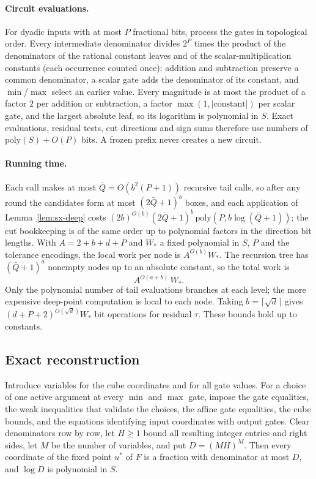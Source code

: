 \paragraph{Circuit evaluations.} For dyadic inputs with at most $P$ fractional bits, process the gates
in topological order. Every intermediate denominator divides $2^P$ times the product of the
denominators of the rational constant leaves and of the scalar-multiplication constants (each occurrence
counted once): addition and subtraction preserve a common denominator, a scalar gate adds the
denominator of its constant, and $\min$/$\max$ select an earlier value. Every magnitude is at most the
product of a factor $2$ per addition or subtraction, a factor $\max(1,|\text{constant}|)$ per scalar
gate, and the largest absolute leaf, so its logarithm is polynomial in $S$. Exact evaluations, residual
tests, cut directions and sign sums therefore use numbers of $\mathrm{poly}(S)+O(P)$ bits. A frozen prefix
never creates a new circuit.

\paragraph{Running time.} Each call makes at most $\bar Q=O(b^2(P+1))$ recursive tail calls, so after any
round the candidates form at most $(2\bar Q+1)^b$ boxes, and each application of
Lemma~\ref{lem:sx-deep} costs $(2b)^{O(b)}(2\bar Q+1)^b\,\mathrm{poly}(P,b\log(\bar Q+1))$; the cut
bookkeeping is of the same order up to polynomial factors in the direction bit lengths. With
$A=2+b+d+P$ and $W_*$ a fixed polynomial in $S$, $P$ and the tolerance encodings, the local work per node
is $A^{O(b)}W_*$. The recursion tree has $(\bar Q+1)^a$ nonempty nodes up to an absolute constant, so the
total work is
\[
  A^{O(a+b)}\,W_* .
\]
Only the polynomial number of tail evaluations branches at each level; the more expensive deep-point
computation is local to each node. Taking $b=\lceil\sqrt d\rceil$ gives $(d+P+2)^{O(\sqrt d)}W_*$ bit
operations for residual $\tau$. These bounds hold up to constants.

\subsection{Exact reconstruction}\label{sec:sx-recon}

\begin{lemma}\label{lem:sx-denom}
Introduce variables for the cube coordinates and for all gate values. For a choice of one active
argument at every $\min$ and $\max$ gate, impose the gate equalities, the weak inequalities that validate
the choices, the affine gate equalities, the cube bounds, and the equations identifying input
coordinates with output gates. Clear denominators row by row, let $H\ge1$ bound all resulting integer
entries and right sides, let $M$ be the number of variables, and put $D=(MH)^M$. Then every coordinate of
the fixed point $u^*$ of $F$ is a fraction with denominator at most $D$, and $\log D$ is polynomial in
$S$.
\end{lemma}

